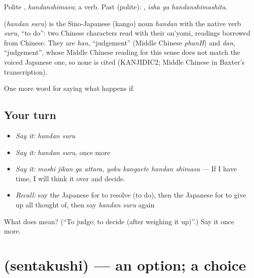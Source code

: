 Polite \textbf{}, \emph{handanshimasu}; a  verb. Past (polite): \textbf{ }, \emph{isha ga handanshimashita}.

\begin{cousinweb}
\textbf{} (\emph{handan suru}) is the Sino-Japanese (kango) noun \emph{handan} with the native verb \emph{suru}, \textquotedblleft{}to do\textquotedblright{}: two Chinese characters read with their on'yomi, readings borrowed from Chinese. They are \emph{han}, \textquotedblleft{}judgement\textquotedblright{} (Middle Chinese \emph{phanH}) and \emph{dan}, \textquotedblleft{}judgement\textquotedblright{}, whose Middle Chinese reading for this sense does not match the voiced Japanese one, so none is cited (KANJIDIC2; Middle Chinese in Baxter's transcription).
\end{cousinweb}

\begin{grammarlens}[title={What you've built}]
One more word for saying what happens if.
\end{grammarlens}

\subsection*{Your turn}
\begin{itemize}
\raggedright
  \item \emph{Say it:} \emph{handan suru}
  \item \emph{Say it:} \emph{handan suru}, once more
  \item \emph{Say it:} \emph{moshi jikan ga attara, yoku kangaete handan shimasu} — If I have time, I will think it over and decide.
  \item \emph{Recall:} say the Japanese for to resolve (to do), then the Japanese for to give up all thought of, then say \emph{handan suru} again
\end{itemize}

\begin{tcolorbox}[breakable,colback=teal!4,colframe=teal!35!black,title={Before you move on}]
What does  mean? (\textquotedblleft{}To judge; to decide (after weighing it up)\textquotedblright{}.) Say it once more.
\end{tcolorbox}
\section[\texorpdfstring{\ja{せんたくし} (sentakushi)}{せんたくし (sentakushi)}]{ (sentakushi) — an option; a choice}

